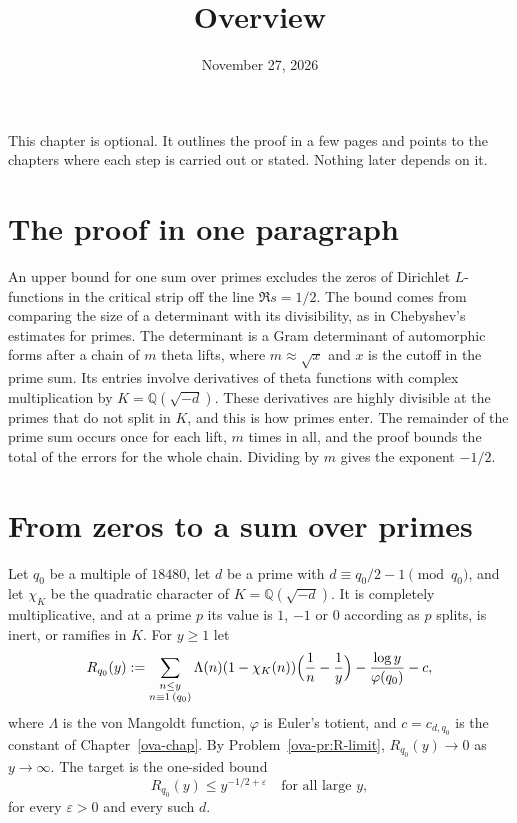 \documentclass[reqno]{amsart}
\title{Overview}
\author{}
\date{November 27, 2026}
\newcounter{chap}
\theoremstyle{definition}
\newcommand{\Q}{\mathbb{Q}}
\begin{document}
\maketitle
{}\label{chap}

This chapter is optional.  It outlines the proof in a few pages and
points to the chapters where each step is carried out or stated.
Nothing later depends on it.

\section{The proof in one paragraph}\label{sec:proof}

An upper bound for one sum over primes excludes the zeros of
Dirichlet \(L\)-functions in the critical strip off the line
\(\Re s = 1/2\).  The bound comes from comparing the size of a
determinant with its divisibility, as in Chebyshev's estimates for
primes.  The determinant is a Gram determinant of automorphic forms
after a chain of \(m\) theta lifts, where \(m \approx \sqrt{x}\) and
\(x\) is the cutoff in the prime sum.  Its entries involve
derivatives of theta functions with complex multiplication by
\(K = \Q(\sqrt{-d})\).  These derivatives are highly divisible at
the primes that do not split in \(K\), and this is how primes
enter.  The remainder of the prime sum occurs once for each lift,
\(m\) times in all, and the proof bounds the total of the errors for
the whole chain.  Dividing by \(m\) gives the exponent \(-1/2\).

\section{From zeros to a sum over primes}\label{sec:zeros}

Let \(q_0\) be a multiple of \(18480\), let \(d\) be a prime with
\(d \equiv q_0/2 - 1 \pmod{q_0}\), and let \(\chi_K\) be the
quadratic character of \(K = \Q(\sqrt{-d})\).  It is completely
multiplicative, and at a prime \(p\) its value is \(1\), \(-1\) or
\(0\) according as \(p\) splits, is inert, or ramifies in \(K\).
For \(y \ge 1\) let
\[
  R_{q_0}(y) :=
  \sum_{\substack{n \le y \\ n \equiv 1 \, (q_0)}}
  \Lambda(n) (1 - \chi_K(n)) \Bigl( \frac{1}{n} - \frac{1}{y} \Bigr)
  - \frac{\log y}{\varphi(q_0)} - c ,
\]
where \(\Lambda\) is the von Mangoldt function, \(\varphi\) is Euler's
totient, and \(c = c_{d,q_0}\) is the constant of
Chapter~\ref{ova-chap}.  By Problem~\ref{ova-pr:R-limit},
\(R_{q_0}(y) \to 0\) as \(y \to \infty\).
The target is the one-sided bound
\begin{equation}\label{eq:target}
  R_{q_0}(y) \le y^{-1/2 + \varepsilon}
  \quad \text{for all large } y,
\end{equation}
for every \(\varepsilon > 0\) and every such \(d\).
\end{document}
